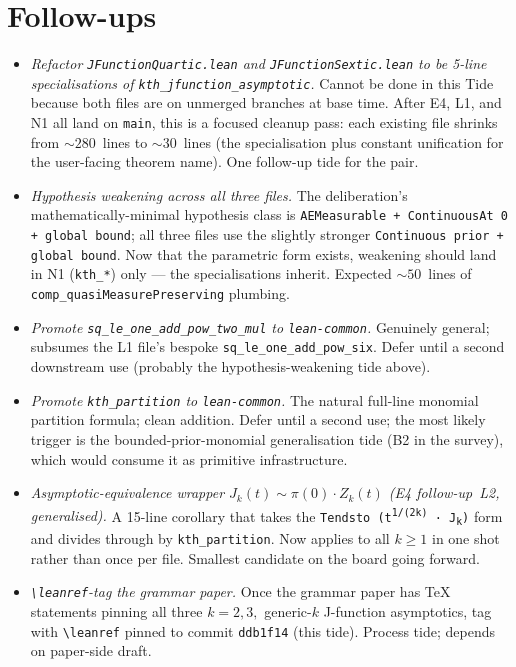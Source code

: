 \documentclass[11pt]{article}
\begin{document}
\section{Follow-ups}

\begin{itemize}[leftmargin=1em,itemsep=0.2em]
\item \emph{Refactor \texttt{JFunctionQuartic.lean} and
  \texttt{JFunctionSextic.lean} to be 5-line specialisations of
  \texttt{kth\_jfunction\_asymptotic}.} Cannot be done in this Tide
  because both files are on unmerged branches at base time. After
  E4, L1, and N1 all land on \texttt{main}, this is a focused
  cleanup pass: each existing file shrinks from ${\sim}280$~lines
  to ${\sim}30$~lines (the specialisation plus constant unification
  for the user-facing theorem name). One follow-up tide for the pair.

\item \emph{Hypothesis weakening across all three files.} The
  deliberation's mathematically-minimal hypothesis class is
  \texttt{AEMeasurable + ContinuousAt 0 + global bound}; all three
  files use the slightly stronger \texttt{Continuous prior + global bound}.
  Now that the parametric form exists, weakening should land in N1
  (\texttt{kth\_*}) only — the specialisations inherit. Expected
  ${\sim}50$~lines of \texttt{comp\_quasiMeasurePreserving} plumbing.

\item \emph{Promote \texttt{sq\_le\_one\_add\_pow\_two\_mul} to
  \texttt{lean-common}.} Genuinely general; subsumes the L1 file's
  bespoke \texttt{sq\_le\_one\_add\_pow\_six}. Defer until a second
  downstream use (probably the hypothesis-weakening tide above).

\item \emph{Promote \texttt{kth\_partition} to \texttt{lean-common}.}
  The natural full-line monomial partition formula; clean addition.
  Defer until a second use; the most likely trigger is the
  bounded-prior-monomial generalisation tide (B2 in the survey),
  which would consume it as primitive infrastructure.

\item \emph{Asymptotic-equivalence wrapper $J_k(t) \sim \pi(0)\cdot Z_k(t)$
  (E4 follow-up~L2, generalised).} A 15-line corollary that takes
  the \texttt{Tendsto (t\textsuperscript{1/(2k)} · J\textsubscript{k})}
  form and divides through by \texttt{kth\_partition}. Now applies
  to all $k \ge 1$ in one shot rather than once per file. Smallest
  candidate on the board going forward.

\item \emph{\texttt{\textbackslash leanref}-tag the grammar paper.}
  Once the grammar paper has TeX statements pinning all three
  $k = 2, 3, $ generic-$k$ J-function asymptotics, tag with
  \texttt{\textbackslash leanref} pinned to commit
  \texttt{ddb1f14} (this tide). Process tide; depends on
  paper-side draft.
\end{itemize}
\end{document}
